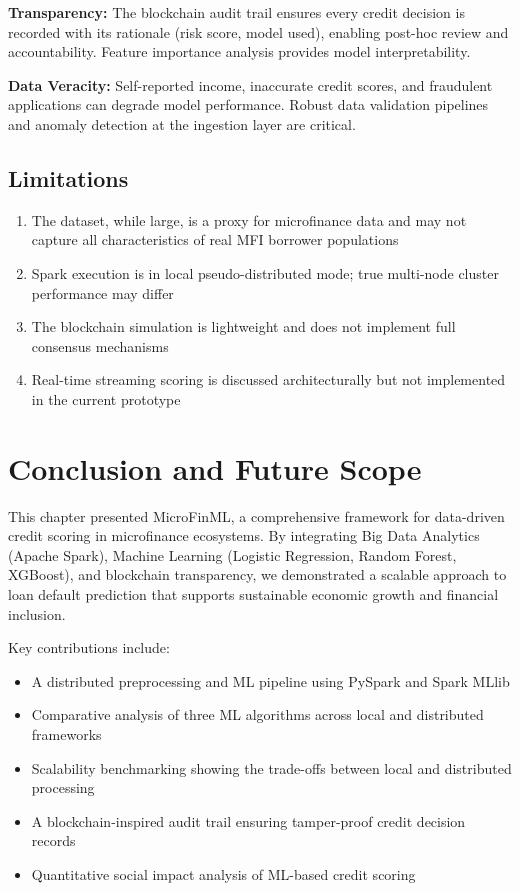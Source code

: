 \documentclass[runningheads]{llncs}
\begin{document}
\textbf{Transparency:} The blockchain audit trail ensures every credit decision is recorded with its rationale (risk score, model used), enabling post-hoc review and accountability. Feature importance analysis provides model interpretability.

\textbf{Data Veracity:} Self-reported income, inaccurate credit scores, and fraudulent applications can degrade model performance. Robust data validation pipelines and anomaly detection at the ingestion layer are critical.

\subsection{Limitations}

\begin{enumerate}
    \item The dataset, while large, is a proxy for microfinance data and may not capture all characteristics of real MFI borrower populations
    \item Spark execution is in local pseudo-distributed mode; true multi-node cluster performance may differ
    \item The blockchain simulation is lightweight and does not implement full consensus mechanisms
    \item Real-time streaming scoring is discussed architecturally but not implemented in the current prototype
\end{enumerate}



\section{Conclusion and Future Scope}
\label{sec:conclusion}

This chapter presented MicroFinML, a comprehensive framework for data-driven credit scoring in microfinance ecosystems. By integrating Big Data Analytics (Apache Spark), Machine Learning (Logistic Regression, Random Forest, XGBoost), and blockchain transparency, we demonstrated a scalable approach to loan default prediction that supports sustainable economic growth and financial inclusion.

Key contributions include:
\begin{itemize}
    \item A distributed preprocessing and ML pipeline using PySpark and Spark MLlib
    \item Comparative analysis of three ML algorithms across local and distributed frameworks
    \item Scalability benchmarking showing the trade-offs between local and distributed processing
    \item A blockchain-inspired audit trail ensuring tamper-proof credit decision records
    \item Quantitative social impact analysis of ML-based credit scoring
\end{itemize}
\end{document}
